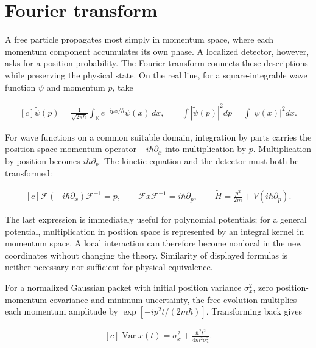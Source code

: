 \documentclass[11pt,oneside]{book}
\newenvironment{centeredalign}{\[\begin{gathered}[c]}{\end{gathered}\]}
\begin{document}
\clearpage

\section{Fourier transform}

\label{topic:fourier-transform}

A free particle propagates most simply in momentum space, where each momentum component accumulates its own phase. A localized detector, however, asks for a position probability. The Fourier transform connects these descriptions while preserving the physical state. On the real line, for a square-integrable wave function \(\psi\) and momentum \(p\), take

\begin{centeredalign}
\widetilde\psi(p)=\frac{1}{\sqrt{2\pi\hbar}}\int_{\mathbb R}
e^{-ipx/\hbar}\psi(x)\,dx,\qquad
\int|\widetilde\psi(p)|^2dp=\int|\psi(x)|^2dx.
\end{centeredalign}

For wave functions on a common suitable domain, integration by parts carries the position-space momentum operator \(-i\hbar\partial_x\) into multiplication by \(p\). Multiplication by position becomes \(i\hbar\partial_p\). The kinetic equation and the detector must both be transformed:

\begin{centeredalign}
\mathcal F(-i\hbar\partial_x)\mathcal F^{-1}=p,\qquad
\mathcal F x\mathcal F^{-1}=i\hbar\partial_p,\qquad
\widetilde H=\frac{p^2}{2m}+V(i\hbar\partial_p).
\end{centeredalign}

The last expression is immediately useful for polynomial potentials; for a general potential, multiplication in position space is represented by an integral kernel in momentum space. A local interaction can therefore become nonlocal in the new coordinates without changing the theory. Similarity of displayed formulas is neither necessary nor sufficient for physical equivalence.

For a normalized Gaussian packet with initial position variance \(\sigma_x^2\), zero position-momentum covariance and minimum uncertainty, the free evolution multiplies each momentum amplitude by \(\exp[-ip^2t/(2m\hbar)]\). Transforming back gives

\begin{centeredalign}
\operatorname{Var}x(t)=\sigma_x^2+
\frac{\hbar^2t^2}{4m^2\sigma_x^2}.
\end{centeredalign}
\end{document}
